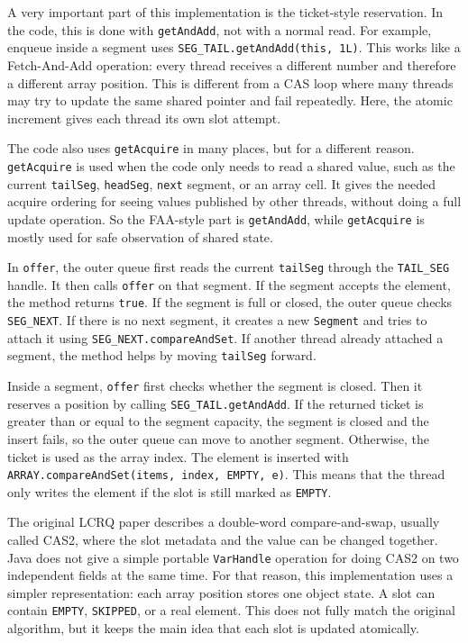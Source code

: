 A very important part of this implementation is the ticket-style reservation. In the code, this is done with \texttt{getAndAdd}, not with a normal read. For example, enqueue inside a segment uses \texttt{SEG\_TAIL.getAndAdd(this, 1L)}. This works like a Fetch-And-Add operation: every thread receives a different number and therefore a different array position. This is different from a CAS loop where many threads may try to update the same shared pointer and fail repeatedly. Here, the atomic increment gives each thread its own slot attempt.

The code also uses \texttt{getAcquire} in many places, but for a different reason. \texttt{getAcquire} is used when the code only needs to read a shared value, such as the current \texttt{tailSeg}, \texttt{headSeg}, \texttt{next} segment, or an array cell. It gives the needed acquire ordering for seeing values published by other threads, without doing a full update operation. So the FAA-style part is \texttt{getAndAdd}, while \texttt{getAcquire} is mostly used for safe observation of shared state.

In \texttt{offer}, the outer queue first reads the current \texttt{tailSeg} through the \texttt{TAIL\_SEG} handle. It then calls \texttt{offer} on that segment. If the segment accepts the element, the method returns \texttt{true}. If the segment is full or closed, the outer queue checks \texttt{SEG\_NEXT}. If there is no next segment, it creates a new \texttt{Segment} and tries to attach it using \texttt{SEG\_NEXT.compareAndSet}. If another thread already attached a segment, the method helps by moving \texttt{tailSeg} forward.


Inside a segment, \texttt{offer} first checks whether the segment is closed. Then it reserves a position by calling \texttt{SEG\_TAIL.getAndAdd}. If the returned ticket is greater than or equal to the segment capacity, the segment is closed and the insert fails, so the outer queue can move to another segment. Otherwise, the ticket is used as the array index. The element is inserted with \texttt{ARRAY.compareAndSet(items, index, EMPTY, e)}. This means that the thread only writes the element if the slot is still marked as \texttt{EMPTY}.

The original LCRQ paper describes a double-word compare-and-swap, usually called CAS2, where the slot metadata and the value can be changed together. Java does not give a simple portable \texttt{VarHandle} operation for doing CAS2 on two independent fields at the same time. For that reason, this implementation uses a simpler representation: each array position stores one object state. A slot can contain \texttt{EMPTY}, \texttt{SKIPPED}, or a real element. This does not fully match the original algorithm, but it keeps the main idea that each slot is updated atomically.

